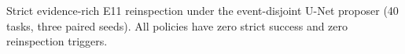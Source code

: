 \begin{table}[t]
\centering
\caption{Strict evidence-rich E11 reinspection under the event-disjoint
U-Net proposer (40 tasks, three paired seeds). All policies have zero
strict success and zero reinspection triggers.}
\label{tab:reinspection}
\resizebox{\columnwidth}{!}{
}
\end{table}
